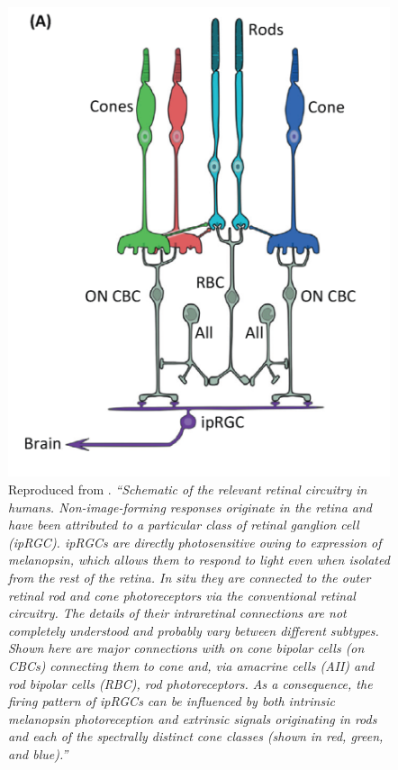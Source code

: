 \begin{figure}[htbp]
\includegraphics[max width=\textwidth, center]{figs/LitRev/lucas.png}
\caption{Reproduced from \citet{lucas_measuring_2014}. \textit{``Schematic of the relevant retinal circuitry in humans. Non-image-forming responses originate in the retina and have been attributed to a particular class of retinal ganglion cell (ipRGC). ipRGCs are directly photosensitive owing to expression of melanopsin, which allows them to respond to light even when isolated from the rest of the retina. In situ they are connected to the outer retinal rod and cone photoreceptors via the conventional retinal circuitry. The details of their intraretinal connections are not completely understood and probably vary between different subtypes. Shown here are major connections with on cone bipolar cells (on CBCs) connecting them to cone and, via amacrine cells (AII) and rod bipolar cells (RBC), rod photoreceptors. As a consequence, the firing pattern of ipRGCs can be influenced by both intrinsic melanopsin photoreception and extrinsic signals originating in rods and each of the spectrally distinct cone classes (shown in red, green, and blue).''}}
\label{fig:lucas}
\end{figure}

